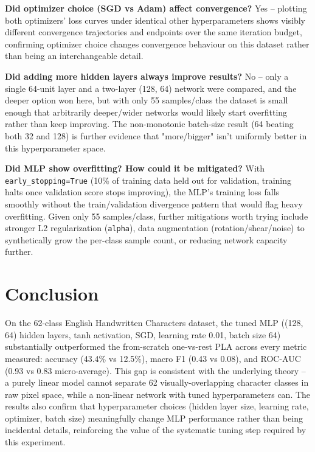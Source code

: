 \documentclass[11pt]{article}
\begin{document}
\textbf{Did optimizer choice (SGD vs Adam) affect convergence?} Yes -- plotting both optimizers'
loss curves under identical other hyperparameters shows visibly different convergence
trajectories and endpoints over the same iteration budget, confirming optimizer choice
changes convergence behaviour on this dataset rather than being an interchangeable detail.

\textbf{Did adding more hidden layers always improve results?} No -- only a single 64-unit layer
and a two-layer (128, 64) network were compared, and the deeper option won here, but with
only 55 samples/class the dataset is small enough that arbitrarily deeper/wider networks
would likely start overfitting rather than keep improving. The non-monotonic batch-size
result (64 beating both 32 and 128) is further evidence that "more/bigger" isn't uniformly
better in this hyperparameter space.

\textbf{Did MLP show overfitting? How could it be mitigated?} With \texttt{early\_stopping=True} (10\% of
training data held out for validation, training halts once validation score stops
improving), the MLP's training loss falls smoothly without the train/validation divergence
pattern that would flag heavy overfitting. Given only 55 samples/class, further mitigations
worth trying include stronger L2 regularization (\texttt{alpha}), data augmentation
(rotation/shear/noise) to synthetically grow the per-class sample count, or reducing network
capacity further.

\section{Conclusion}
\label{sec:orgf7942c7}

On the 62-class English Handwritten Characters dataset, the tuned MLP ((128, 64) hidden
layers, tanh activation, SGD, learning rate 0.01, batch size 64) substantially outperformed
the from-scratch one-vs-rest PLA across every metric measured: accuracy (43.4\% vs 12.5\%),
macro F1 (0.43 vs 0.08), and ROC-AUC (0.93 vs 0.83 micro-average). This gap is consistent
with the underlying theory -- a purely linear model cannot separate 62 visually-overlapping
character classes in raw pixel space, while a non-linear network with tuned hyperparameters
can. The results also confirm that hyperparameter choices (hidden layer size, learning rate,
optimizer, batch size) meaningfully change MLP performance rather than being incidental
details, reinforcing the value of the systematic tuning step required by this experiment.
\end{document}
